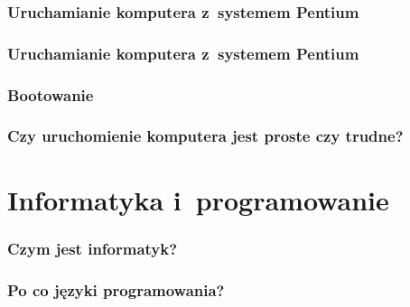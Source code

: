 \documentclass[10pt,t]{beamer}
\begin{document}
\begin{frame}
  \frametitle{Uruchamianie komputera z~systemem Pentium}




\end{frame}





\begin{frame}
  \frametitle{Uruchamianie komputera z~systemem Pentium}




\end{frame}






\begin{frame}
  \frametitle{Bootowanie}




\end{frame}





\begin{frame}
  \frametitle{Czy uruchomienie komputera jest proste czy trudne?}




\end{frame}










\section{Informatyka i~programowanie}



\begin{frame}
  \frametitle{Czym jest informatyk?}



\end{frame}





\begin{frame}
  \frametitle{Po co języki programowania?}




\end{frame}
\end{document}
